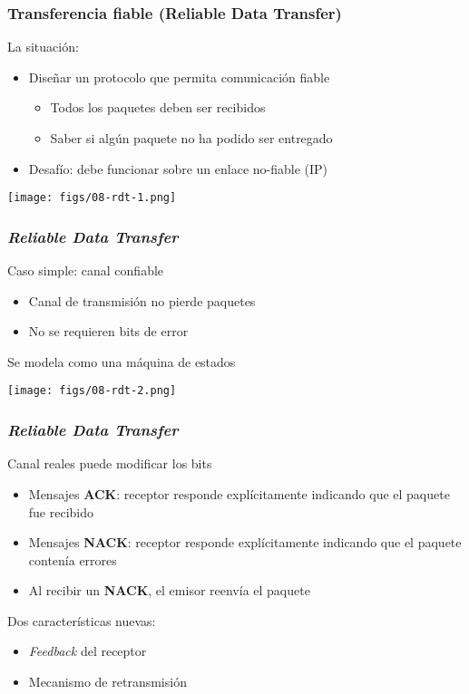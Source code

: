 \documentclass[letter]{beamer}
\begin{document}
\begin{frame}
  \frametitle{Transferencia fiable (Reliable Data Transfer)}
  
  La situación:  
  \begin{itemize}
    \item Diseñar un protocolo que permita comunicación fiable
      \begin{itemize}
        \item Todos los paquetes deben ser recibidos
        \item Saber si algún paquete no ha podido ser entregado
      \end{itemize}
    \item Desafío: debe funcionar sobre un enlace no-fiable (IP)
  \end{itemize}

  \begin{center}
    \texttt{[image: figs/08-rdt-1.png]}
  \end{center}

\end{frame}

\begin{frame}
  \frametitle{{\em Reliable Data Transfer}}

  Caso simple: canal confiable
  \begin{itemize}
    \item Canal de transmisión no pierde paquetes
    \item No se requieren bits de error
  \end{itemize}
  Se modela como una máquina de estados
  
  \begin{center}
    \texttt{[image: figs/08-rdt-2.png]}
  \end{center}

\end{frame}
\begin{frame}
  \frametitle{{\em Reliable Data Transfer}}

  Canal reales puede modificar los bits
  \begin{itemize}
    \item Mensajes {\bf ACK}: receptor responde explícitamente indicando que el paquete fue recibido
    \item Mensajes {\bf NACK}: receptor responde explícitamente indicando que el paquete contenía errores
    \item Al recibir un {\bf NACK}, el emisor reenvía el paquete
  \end{itemize}
  Dos características nuevas:
  \begin{itemize}
    \item {\em Feedback} del receptor
    \item Mecanismo de retransmisión
  \end{itemize}

\end{frame}
\end{document}
